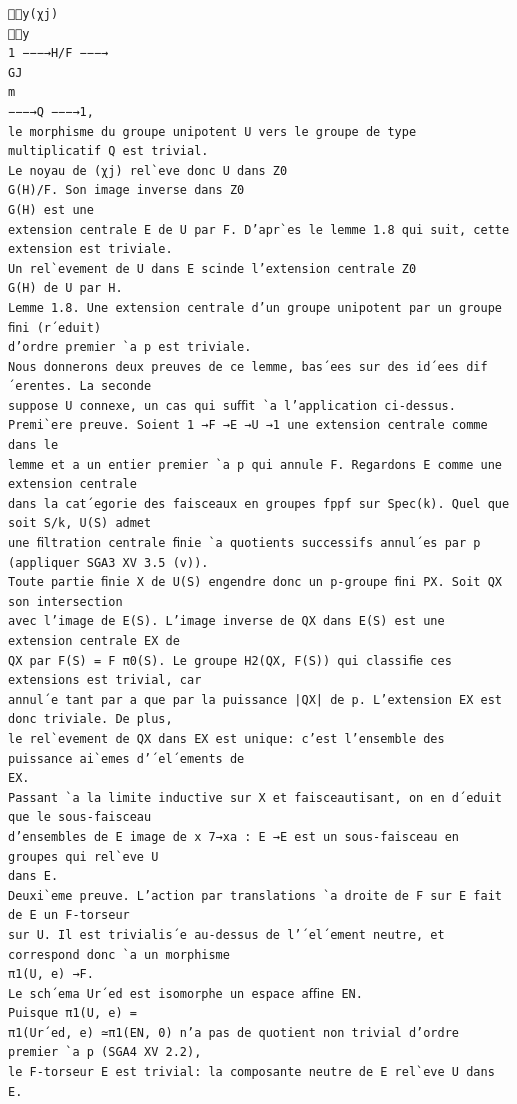 \documentclass[10pt]{article}
\begin{document}
\begin{verbatim}
y(χj)
y
1 −−−→H/F −−−→
GJ
m
−−−→Q −−−→1,
le morphisme du groupe unipotent U vers le groupe de type multiplicatif Q est trivial.
Le noyau de (χj) rel`eve donc U dans Z0
G(H)/F. Son image inverse dans Z0
G(H) est une
extension centrale E de U par F. D’apr`es le lemme 1.8 qui suit, cette extension est triviale.
Un rel`evement de U dans E scinde l’extension centrale Z0
G(H) de U par H.
Lemme 1.8. Une extension centrale d’un groupe unipotent par un groupe ﬁni (r´eduit)
d’ordre premier `a p est triviale.
Nous donnerons deux preuves de ce lemme, bas´ees sur des id´ees dif´erentes. La seconde
suppose U connexe, un cas qui suﬃt `a l’application ci-dessus.
Premi`ere preuve. Soient 1 →F →E →U →1 une extension centrale comme dans le
lemme et a un entier premier `a p qui annule F. Regardons E comme une extension centrale
dans la cat´egorie des faisceaux en groupes fppf sur Spec(k). Quel que soit S/k, U(S) admet
une ﬁltration centrale ﬁnie `a quotients successifs annul´es par p (appliquer SGA3 XV 3.5 (v)).
Toute partie ﬁnie X de U(S) engendre donc un p-groupe ﬁni PX. Soit QX son intersection
avec l’image de E(S). L’image inverse de QX dans E(S) est une extension centrale EX de
QX par F(S) = F π0(S). Le groupe H2(QX, F(S)) qui classiﬁe ces extensions est trivial, car
annul´e tant par a que par la puissance |QX| de p. L’extension EX est donc triviale. De plus,
le rel`evement de QX dans EX est unique: c’est l’ensemble des puissance ai`emes d’´el´ements de
EX.
Passant `a la limite inductive sur X et faisceautisant, on en d´eduit que le sous-faisceau
d’ensembles de E image de x 7→xa : E →E est un sous-faisceau en groupes qui rel`eve U
dans E.
Deuxi`eme preuve. L’action par translations `a droite de F sur E fait de E un F-torseur
sur U. Il est trivialis´e au-dessus de l’´el´ement neutre, et correspond donc `a un morphisme
π1(U, e) →F.
Le sch´ema Ur´ed est isomorphe un espace aﬃne EN.
Puisque π1(U, e) =
π1(Ur´ed, e) ≃π1(EN, 0) n’a pas de quotient non trivial d’ordre premier `a p (SGA4 XV 2.2),
le F-torseur E est trivial: la composante neutre de E rel`eve U dans E.


\end{verbatim}
\end{document}
